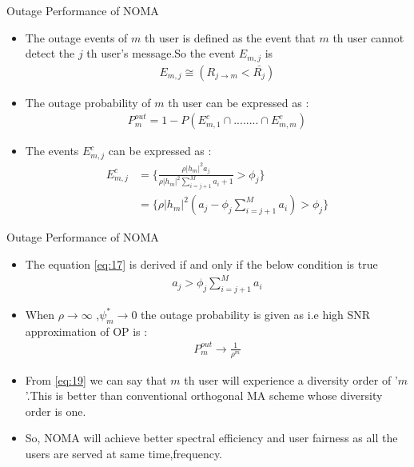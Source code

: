 \documentclass{beamer}
\providecommand{\brak}[1]{\ensuremath{\left(#1\right)}}
\providecommand{\abs}[1]{\vert#1\vert}
\begin{document}
    \begin{frame}
        \begin{block}{Outage Performance of NOMA}
        \begin{itemize}
            \item The outage events of $m$ th user is defined as the event that $m$ th user cannot detect the $j$ th user's message.So the event $E_{m,j}$ is
            \begin{align}
            E_{m,j}\cong \brak{R_{j\rightarrow m}< \bar{R_j}}
            \end{align}
            \item The outage probability of $m$ th user can be expressed as :
            \begin{align}
                P_{m}^{out}=1-P({E_{m,1}^c} \cap ........\cap {E_{m,m}^c })
            \end{align}
            \item The events $E_{m,j}^c$ can be expressed as :
            \begin{align}
                E_{m,j}^c &=\Bigg\{\frac{\rho\abs{h_{m}}^{2} a_{j}}{\rho\abs{h_{m}}^2\sum_{i=j+1}^{M}a_{i}+1}> \phi_j\Bigg\}\\
                &=\Bigg\{\rho\abs{h_m}^2 \brak{a_j-\phi_j\sum_{i=j+1}^{M}a_i}>\phi_j\Bigg\}\label{eq:17}
            \end{align}
        \end{itemize}
        \end{block}
        \end{frame}
        \begin{frame}{}
            \begin{block}{Outage Performance of NOMA}
            \begin{itemize}
                \item The  equation \eqref{eq:17} is derived if and only if the  below condition is true \begin{align}
                a_j >\phi_j\sum_{i=j+1}^{M} a_i \label{eq:18}
                \end{align}
                \item When $\rho \rightarrow \infty$ ,$\psi_m^{*}\rightarrow 0$ the outage probability is given as i.e high SNR approximation of OP is :
                \begin{align}
                    P_m^{out} \rightarrow \frac{1}{\rho^m} \label{eq:19}
                \end{align}
                \item From \eqref{eq:19}  we can say that  $m$ th user will experience a diversity order of '$m$'.This is better than conventional orthogonal MA scheme whose diversity order is one. 
                \item So, NOMA will achieve better spectral efficiency and user fairness as all the users are served at same time,frequency.
            \end{itemize}
            \end{block}
        \end{frame}
\end{document}
